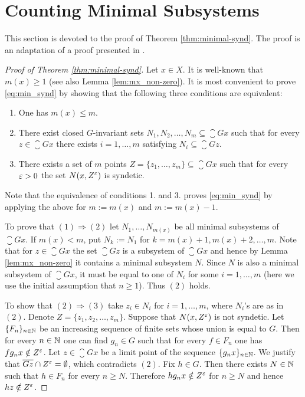 \section{Counting Minimal Subsystems}
This section is devoted to the proof of Theorem \ref{thm:minimal-synd}. The proof is an adaptation of a proof presented in \cite{DI88}.
\begin{proof}[Proof of Theorem \ref{thm:minimal-synd}]
Let $x\in X$. It is well-known that $m(x)\geq 1$ (see also Lemma \ref{lem:mx_non-zero}).
%
It is most convenient to prove \eqref{eq:min_synd} by showing that the following three conditions are equivalent:
\begin{enumerate}
\item One has $m(x)\leq m$.
\item\label{cond:N-sety} There exist closed $G$-invariant sets $N_1,N_2,\ldots, N_m\subseteq \closure{Gx}$ such that for every $z\in\closure{Gx}$ there exists $i=1,\ldots,m$ satisfying $N_i\subseteq \closure{Gz}$.
\item There exists a set of $m$ points $Z=\{z_1,\ldots, z_m\}\subseteq \closure{Gx}$ such that for every $\varepsilon>0$ the set $N(x, Z^{\varepsilon})$ is syndetic.\label{2}
\end{enumerate}
Note that the equivalence of conditions 1. and 3. proves \eqref{eq:min_synd} by applying the above for $m:=m(x)$ and $m:=m(x)-1$.

To prove that $(1)\Rightarrow (2)$ let $N_1,\ldots, N_{m(x)}$ be all minimal subsystems of $\closure{Gx}$. If $m(x)<m$,  put $N_k:=N_1$ for $k=m(x)+1,m(x)+2,\ldots,m$. Note that for $z\in \closure{Gx}$ the set $\closure{Gz}$ is a subsystem of $\closure{Gx}$ and hence by Lemma \ref{lem:mx_non-zero} it contains a minimal subsystem $N$. Since $N$ is also a minimal subsystem of $\closure{Gx}$, it must be equal to one of $N_i$ for some $i=1,\ldots,m$ (here we use the initial assumption that $n\geq 1$).
Thus $(2)$ holds.

To show that $(2)\Rightarrow (3)$ take $z_i\in N_i$ for $i=1,\ldots,m$, where $N_i$'s are as in $(2)$. Denote $Z=\{z_1,z_2,\ldots,z_m\}$.
Suppose that  $N(x, Z^{\varepsilon})$ is not syndetic. Let $\{F_n\}_{n\in\mathbb{N}}$ be an increasing sequence of finite sets whose union is equal to $G$. Then for every $n\in\mathbb{N}$ one can find $g_n\in G$ such that for every $f\in F_n$ one has $fg_n x\notin Z^{\varepsilon}$. Let $z\in \closure{Gx}$ be a limit point of the sequence $\{g_n x\}_{n\in\mathbb{N}}$. We justify that $\overline{Gz}\cap Z^{\varepsilon}=\emptyset$, which contradicts $(2)$. Fix $h\in G$. Then there exists $N\in\mathbb{N}$ such that $h\in F_n$ for every $n\geq N$. Therefore $hg_nx\notin Z^\varepsilon$ for $n\geq N$ and hence $hz\notin Z^\varepsilon$.


\end{proof}
